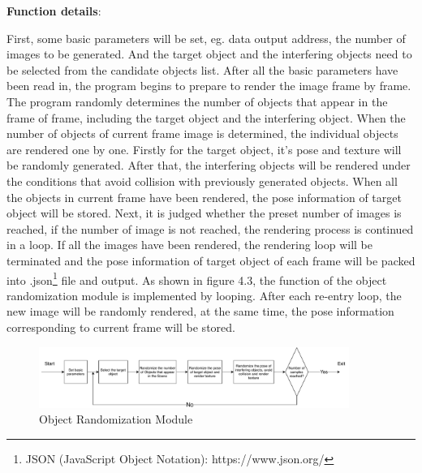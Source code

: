 \textbf{Function details}:

First, some basic parameters will be set, eg. data output address, the number of images to be generated. And the target object and the interfering objects need to be selected from the candidate objects list. After all the basic parameters have been read in, the program begins to prepare to render the image frame by frame. The program randomly determines the number of objects that appear in the frame of frame, including the target object and the interfering object. When the number of objects of current frame image is determined, the individual objects are rendered one by one. Firstly for the target object, it's pose and texture will be randomly generated. After that, the interfering objects will be rendered under the conditions that avoid collision with previously generated objects. When all the objects in current frame have been rendered, the pose information of target object will be stored. Next, it is judged whether the preset number of images is reached, if the number of image is not reached, the rendering process is continued in a loop. If all the images have been rendered, the rendering loop will be terminated and the pose information of target object of each frame will be packed into .json\footnote{JSON (JavaScript Object Notation): https://www.json.org/} file and output. As shown in figure 4.3, the function of the object randomization module is implemented by looping. After each re-entry loop, the new image will be randomly rendered, at the same time, the pose information corresponding to current frame will be stored.

\begin{figure}[h]
	\includegraphics[width=0.9\textwidth]{Figures/Section4_Object_randomization.pdf} 
	\centering
	\captionsetup{justification=centering}
	\caption{Object Randomization Module}
	\label{fig:objrand}
\end{figure}

